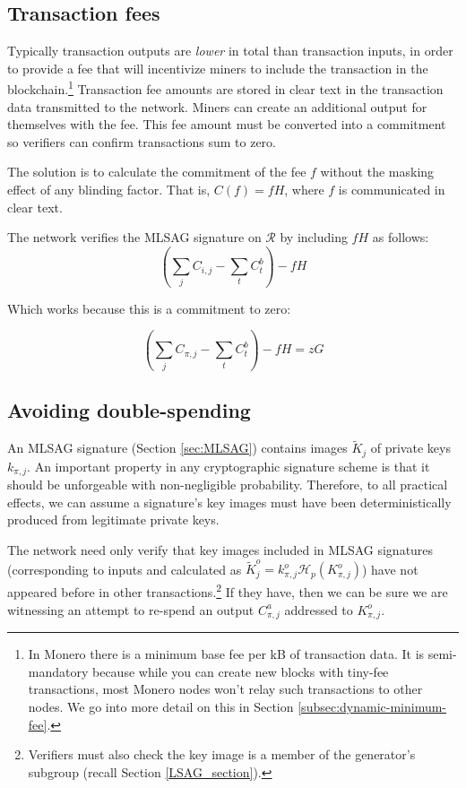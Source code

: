 \subsection{Transaction fees}

Typically transaction outputs are {\em lower} in total than transaction inputs, in order to provide a fee that will incentivize miners to include the transaction in the blockchain.\footnote{In Monero there is a minimum base fee per kB of transaction data. It is semi-mandatory because while you can create new blocks with tiny-fee transactions, most Monero nodes won't relay such transactions to other nodes. We go into more detail on this in Section \ref{subsec:dynamic-minimum-fee}.} Transaction fee amounts are stored in clear text in the transaction data transmitted to the network. Miners can create an additional output for themselves with the fee. This fee amount must be converted into a commitment so verifiers can confirm transactions sum to zero.

The solution is to calculate the commitment of the fee $f$ without the masking effect of any blinding factor. That is, $C(f) = f H$, where $f$ is communicated in clear text.

The network verifies the MLSAG signature on $\mathcal{R}$ by including $f H$ as follows:\\
\[ (\sum\limits_j C_{i, j} - \sum\limits_t C^b_{t}) - f H\]

Which works because this is a commitment to zero:

\[ (\sum\limits_j C_{\pi, j} - \sum\limits_t C^b_{t}) - f H = z G\]


\subsection{Avoiding double-spending}

An MLSAG signature (Section \ref{sec:MLSAG}) contains images \(\tilde{K}_{j}\) of private keys \(k_{\pi, j}\). An important property in any cryptographic signature scheme is that it should be unforgeable with non-negligible probability. Therefore, to all practical effects, we can assume a signature’s key images must have been deterministically produced from legitimate private keys.

The network need only verify that key images included in MLSAG signatures (corresponding to inputs and calculated as $\tilde{K}^o_{j} = k^o_{\pi,j} \mathcal{H}_p(K^o_{\pi,j})$) have not appeared before in other transactions.\footnote{Verifiers must also check the key image is a member of the generator's subgroup (recall Section \ref{LSAG_section}).} If they have, then we can be sure we are witnessing an attempt to re-spend an output $C^a_{\pi,j}$ addressed to $K_{\pi,j}^o$.

